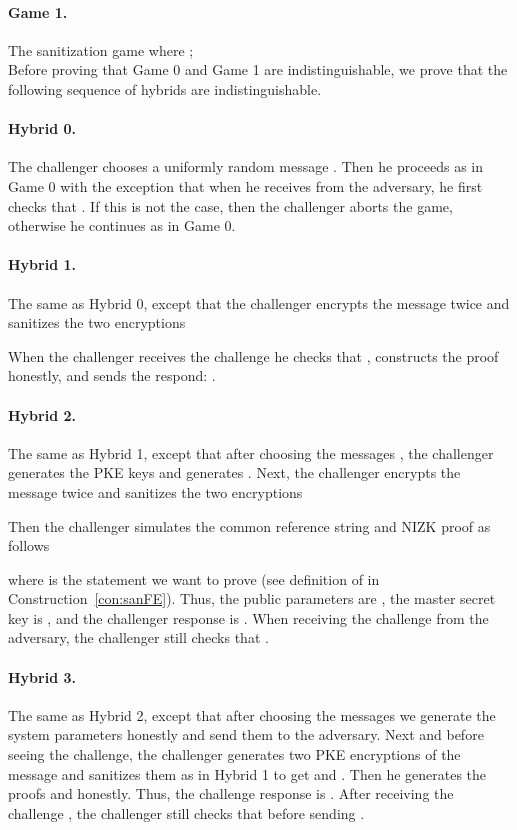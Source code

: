 \documentclass{llncs}
\begin{document}
\paragraph{Game 1.} The sanitization game where ; \\

Before proving that Game 0 and Game 1 are indistinguishable, we  prove that the following sequence of hybrids are indistinguishable. 

\paragraph{Hybrid 0.} The challenger chooses a uniformly random message . Then he proceeds as in Game 0 with the exception that when he receives  from the adversary, he first checks that . If this is not the case, then the challenger aborts the game, otherwise he continues as in Game 0.

\paragraph{Hybrid 1.} The same as Hybrid 0, except that the challenger encrypts the message  twice and sanitizes the two encryptions
	
	When the challenger receives the challenge  he checks that , constructs the proof  honestly, and sends the respond: .

\paragraph{Hybrid 2.} The same as Hybrid 1, except that after choosing the messages , the challenger generates the PKE keys  and generates . 
Next, the challenger encrypts the message  twice and sanitizes the two encryptions
	
Then the challenger simulates the common reference string  and NIZK proof  as follows
	
	where  is the statement we want to prove (see definition of  in Construction~\ref{con:sanFE}). 
Thus, the public parameters are , the master secret key is , and the challenger response is .
When receiving the challenge  from the adversary, the challenger still checks that .

\paragraph{Hybrid 3.} The same as Hybrid 2, except that after choosing the messages  we generate the system parameters honestly and send them to the adversary. 
Next and before seeing the challenge, the challenger generates two PKE encryptions of the message  and sanitizes them as in Hybrid 1 to get  and . Then he generates the proofs  and  honestly. Thus, the challenge response is .
After receiving the challenge , the challenger still checks that  before sending .
\end{document}

